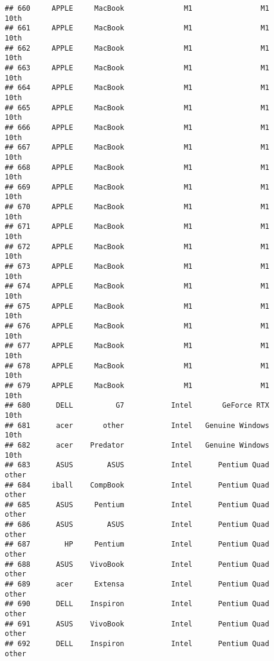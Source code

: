 \documentclass[
]{article}
\begin{document}
\begin{verbatim}
## 660     APPLE     MacBook              M1                M1            10th
## 661     APPLE     MacBook              M1                M1            10th
## 662     APPLE     MacBook              M1                M1            10th
## 663     APPLE     MacBook              M1                M1            10th
## 664     APPLE     MacBook              M1                M1            10th
## 665     APPLE     MacBook              M1                M1            10th
## 666     APPLE     MacBook              M1                M1            10th
## 667     APPLE     MacBook              M1                M1            10th
## 668     APPLE     MacBook              M1                M1            10th
## 669     APPLE     MacBook              M1                M1            10th
## 670     APPLE     MacBook              M1                M1            10th
## 671     APPLE     MacBook              M1                M1            10th
## 672     APPLE     MacBook              M1                M1            10th
## 673     APPLE     MacBook              M1                M1            10th
## 674     APPLE     MacBook              M1                M1            10th
## 675     APPLE     MacBook              M1                M1            10th
## 676     APPLE     MacBook              M1                M1            10th
## 677     APPLE     MacBook              M1                M1            10th
## 678     APPLE     MacBook              M1                M1            10th
## 679     APPLE     MacBook              M1                M1            10th
## 680      DELL          G7           Intel       GeForce RTX            10th
## 681      acer       other           Intel   Genuine Windows            10th
## 682      acer    Predator           Intel   Genuine Windows            10th
## 683      ASUS        ASUS           Intel      Pentium Quad           other
## 684     iball    CompBook           Intel      Pentium Quad           other
## 685      ASUS     Pentium           Intel      Pentium Quad           other
## 686      ASUS        ASUS           Intel      Pentium Quad           other
## 687        HP     Pentium           Intel      Pentium Quad           other
## 688      ASUS    VivoBook           Intel      Pentium Quad           other
## 689      acer     Extensa           Intel      Pentium Quad           other
## 690      DELL    Inspiron           Intel      Pentium Quad           other
## 691      ASUS    VivoBook           Intel      Pentium Quad           other
## 692      DELL    Inspiron           Intel      Pentium Quad           other

\end{verbatim}
\end{document}
